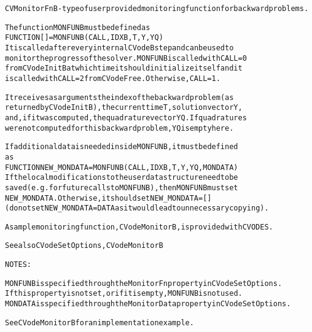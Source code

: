 \begin{alltt}
CVMonitorFnB - type of user provided monitoring function for backward problems.

   The function MONFUNB must be defined as
       FUNCTION [] = MONFUNB(CALL, IDXB, T, Y, YQ)
   It is called after every internal CVodeB step and can be used to
   monitor the progress of the solver. MONFUNB is called with CALL=0
   from CVodeInitB at which time it should initialize itself and it
   is called with CALL=2 from CVodeFree. Otherwise, CALL=1.

   It receives as arguments the index of the backward problem (as
   returned by CVodeInitB), the current time T, solution vector Y,
   and, if it was computed, the quadrature vector YQ. If quadratures
   were not computed for this backward problem, YQ is empty here.

   If additional data is needed inside MONFUNB, it must be defined
   as
      FUNCTION NEW_MONDATA = MONFUNB(CALL, IDXB, T, Y, YQ, MONDATA)
   If the local modifications to the user data structure need to be 
   saved (e.g. for future calls to MONFUNB), then MONFUNB must set
   NEW_MONDATA. Otherwise, it should set NEW_MONDATA=[] 
   (do not set NEW_MONDATA = DATA as it would lead to unnecessary copying).

   A sample monitoring function, CVodeMonitorB, is provided with CVODES.

   See also CVodeSetOptions, CVodeMonitorB

   NOTES:

   MONFUNB is specified through the MonitorFn property in CVodeSetOptions.
   If this property is not set, or if it is empty, MONFUNB is not used.
   MONDATA is specified through the MonitorData property in CVodeSetOptions.

   See CVodeMonitorB for an implementation example.
\end{alltt}






\vspace{0.1in}